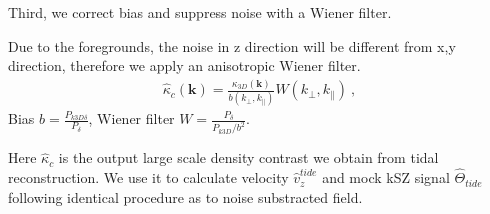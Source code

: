 Third, we correct bias and suppress noise with a Wiener filter.

Due to the foregrounds, the noise in z direction will be different from x,y direction, therefore we apply an anisotropic Wiener filter.
\begin{eqnarray}
	\label{eq:wiener}
\hat \kappa_{c}(\bm{k})=\frac{\kappa_{3D}(\bm{k})}{b(k_\perp,k_\parallel)}W(k_\perp,k_\parallel)\ ,
\end{eqnarray}
Bias $b=\frac{P_{k3D \delta}}{P_\delta}$, Wiener filter $W=\frac{P_\delta}{P_{k3D}/b^2}$.

Here $\hat \kappa_{c}$ is the output large scale density contrast we obtain from tidal reconstruction.
We use it to calculate velocity $\hat v_z^{tide}$ and mock kSZ signal $\hat \Theta_{tide}$ following identical procedure as to noise substracted field.

